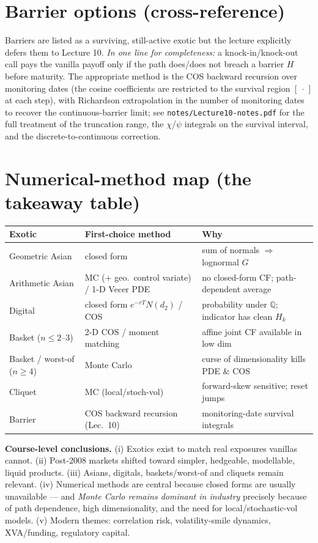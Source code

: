 \documentclass[11pt]{article}
\newcommand{\Q}{\mathbb{Q}}
\begin{document}
\section{Barrier options (cross-reference)}

Barriers are listed as a surviving, still-active exotic but the lecture explicitly defers them to
Lecture 10. \emph{In one line for completeness:} a knock-in/knock-out call pays the vanilla payoff
only if the path does/does not breach a barrier $H$ before maturity. The appropriate method is the COS
backward recursion over monitoring dates (the cosine coefficients are restricted to the survival
region $[\,\cdot\,]$ at each step), with Richardson extrapolation in the number of monitoring dates
to recover the continuous-barrier limit; see \texttt{notes/Lecture10-notes.pdf} for the full treatment
of the truncation range, the $\chi$/$\psi$ integrals on the survival interval, and the
discrete-to-continuous correction.

\section{Numerical-method map (the takeaway table)}

\begin{center}
\begin{tabular}{lll}
\hline
Exotic & First-choice method & Why \\
\hline
Geometric Asian & closed form & sum of normals $\Rightarrow$ lognormal $G$ \\
Arithmetic Asian & MC (+ geo.\ control variate) / 1-D Vecer PDE & no closed-form CF; path-dependent average \\
Digital & closed form $e^{-rT}N(d_2)$ / COS & probability under $\Q$; indicator has clean $H_k$ \\
Basket ($n\le 2$--3) & 2-D COS / moment matching & affine joint CF available in low dim \\
Basket / worst-of ($n\ge 4$) & Monte Carlo & curse of dimensionality kills PDE \& COS \\
Cliquet & MC (local/stoch-vol) & forward-skew sensitive; reset jumps \\
Barrier & COS backward recursion (Lec.\ 10) & monitoring-date survival integrals \\
\hline
\end{tabular}
\end{center}

\noindent\textbf{Course-level conclusions.} (i) Exotics exist to match real exposures vanillas cannot.
(ii) Post-2008 markets shifted toward simpler, hedgeable, modellable, liquid products. (iii) Asians,
digitals, baskets/worst-of and cliquets remain relevant. (iv) Numerical methods are central because
closed forms are usually unavailable --- and \emph{Monte Carlo remains dominant in industry} precisely
because of path dependence, high dimensionality, and the need for local/stochastic-vol models.
(v) Modern themes: correlation risk, volatility-smile dynamics, XVA/funding, regulatory capital.
\end{document}
